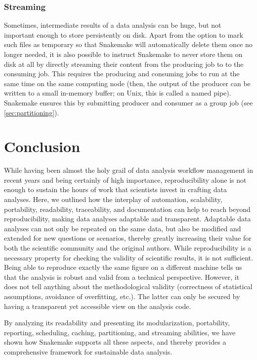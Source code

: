 \documentclass[parskip=half, DIV=18]{scrartcl}
\begin{document}
\subsubsection{Streaming}\label{sec:streaming}

Sometimes, intermediate results of a data analysis can be huge, but not important enough to store persistently on disk.
Apart from the option to mark such files as temporary so that Snakemake will automatically delete them once no longer needed, it is also possible to instruct Snakemake to never store them on disk at all by directly streaming their content from the producing job to to the consuming job.
This requires the producing and consuming jobs to run at the same time on the same computing node (then, the output of the producer can be written to a small in-memory buffer; on Unix, this is called a named pipe).
Snakemake ensures this by submitting producer and consumer as a group job (see \autoref{sec:partitioning}).

\section{Conclusion}

While having been almost the holy grail of data analysis workflow management in recent years and being certainly of high importance, reproducibility alone is not enough to sustain the hours of work that scientists invest in crafting data analyses.
Here, we outlined how the interplay of automation, scalability, portability, readability, traceability, and documentation can help to reach beyond reproducibility, making data analyses adaptable and transparent.
Adaptable data analyses can not only be repeated on the same data, but also be modified and extended for new questions or scenarios, thereby greatly increasing their value for both the scientific community and the original authors.
While reproducibility is a necessary property for checking the validity of scientific results, it is not sufficient.
Being able to reproduce exactly the same figure on a different machine tells us that the analysis is robust and valid from a technical perspective.
However, it does not tell anything about the methodological validity (correctness of statistical assumptions, avoidance of overfitting, etc.).
The latter can only be secured by having a transparent yet accessible view on the analysis code.

By analyzing its readability and presenting its modularization, portability, reporting, scheduling, caching, partitioning, and streaming abilities, we have shown how Snakemake supports all these aspects, and thereby provides a comprehensive framework for sustainable data analysis.
\end{document}
